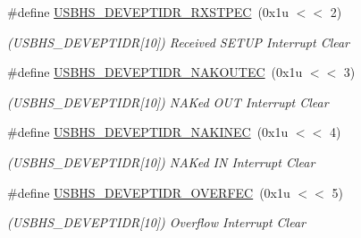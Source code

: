 \begin{DoxyCompactItemize}
\mbox{\label{group__SAMS70__USBHS_ga18068a537cfad8da0c67350f65957253}} 
\#define \mbox{\hyperlink{group__SAMS70__USBHS_ga18068a537cfad8da0c67350f65957253}{U\+S\+B\+H\+S\+\_\+\+D\+E\+V\+E\+P\+T\+I\+D\+R\+\_\+\+R\+X\+S\+T\+P\+EC}}~(0x1u $<$$<$ 2)
\begin{DoxyCompactList}\small\item\em (U\+S\+B\+H\+S\+\_\+\+D\+E\+V\+E\+P\+T\+I\+DR\mbox{[}10\mbox{]}) Received S\+E\+T\+UP Interrupt Clear \end{DoxyCompactList}\item 
\mbox{\label{group__SAMS70__USBHS_ga129076516fd5a8e9f0067f014ac39e12}} 
\#define \mbox{\hyperlink{group__SAMS70__USBHS_ga129076516fd5a8e9f0067f014ac39e12}{U\+S\+B\+H\+S\+\_\+\+D\+E\+V\+E\+P\+T\+I\+D\+R\+\_\+\+N\+A\+K\+O\+U\+T\+EC}}~(0x1u $<$$<$ 3)
\begin{DoxyCompactList}\small\item\em (U\+S\+B\+H\+S\+\_\+\+D\+E\+V\+E\+P\+T\+I\+DR\mbox{[}10\mbox{]}) N\+A\+Ked O\+UT Interrupt Clear \end{DoxyCompactList}\item 
\mbox{\label{group__SAMS70__USBHS_ga421f5227963f7f012335278589732375}} 
\#define \mbox{\hyperlink{group__SAMS70__USBHS_ga421f5227963f7f012335278589732375}{U\+S\+B\+H\+S\+\_\+\+D\+E\+V\+E\+P\+T\+I\+D\+R\+\_\+\+N\+A\+K\+I\+N\+EC}}~(0x1u $<$$<$ 4)
\begin{DoxyCompactList}\small\item\em (U\+S\+B\+H\+S\+\_\+\+D\+E\+V\+E\+P\+T\+I\+DR\mbox{[}10\mbox{]}) N\+A\+Ked IN Interrupt Clear \end{DoxyCompactList}\item 
\mbox{\label{group__SAMS70__USBHS_gabb9709b9f1946dd48901e2a9a7b6ce9f}} 
\#define \mbox{\hyperlink{group__SAMS70__USBHS_gabb9709b9f1946dd48901e2a9a7b6ce9f}{U\+S\+B\+H\+S\+\_\+\+D\+E\+V\+E\+P\+T\+I\+D\+R\+\_\+\+O\+V\+E\+R\+F\+EC}}~(0x1u $<$$<$ 5)
\begin{DoxyCompactList}\small\item\em (U\+S\+B\+H\+S\+\_\+\+D\+E\+V\+E\+P\+T\+I\+DR\mbox{[}10\mbox{]}) Overflow Interrupt Clear \end{DoxyCompactList}\item 
\mbox{\label{group__SAMS70__USBHS_ga5cea648181f2c3156e6032c654e37c3f}} 

\end{DoxyCompactItemize}
